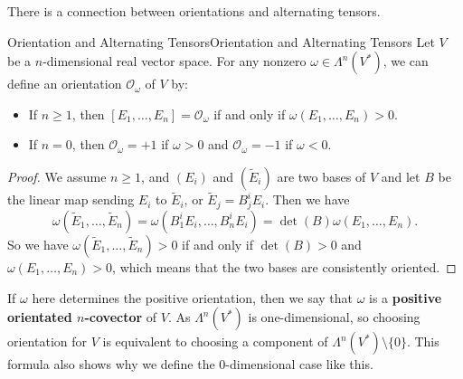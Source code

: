 \documentclass[../main.tex]{subfiles}
\begin{document}
There is a connection between orientations and alternating tensors.
\begin{proposition}{Orientation and Alternating Tensors}{Orientation and Alternating Tensors}
  Let $V$ be a $n$-dimensional real vector space. For any nonzero $\omega \in \Lambda^n(V^*)$, we can define an orientation $\mathcal{O}_\omega$ of $V$ by:
  \begin{itemize}
    \item If $n\geq 1$, then $[E_1, \ldots , E_n] = \mathcal{O}_\omega$ if and only if $\omega(E_1, \ldots , E_n) > 0$.
    \item If $n=0$, then $\mathcal{O}_\omega = +1$ if $\omega > 0$ and $\mathcal{O}_\omega = -1$ if $\omega < 0$.
  \end{itemize}
\end{proposition}
\begin{proof}
  We assume $n \geq 1$, and $(E_i)$ and $(\tilde{E}_i)$ are two bases of $V$ and let $B$ be the linear map sending $E_i$ to $\tilde{E}_i$, or $\tilde{E}_j = B^i_j E_i$. Then we have
  \begin{equation*}
    \omega(\tilde{E}_1, \ldots , \tilde{E}_n) = \omega(B^i_1 E_i, \ldots , B^i_n E_i) = \det(B) \omega(E_1, \ldots , E_n).
  \end{equation*}
  So we have $\omega(\tilde{E}_1, \ldots , \tilde{E}_n) > 0$ if and only if $\det(B) > 0$ and $\omega(E_1, \ldots , E_n) > 0$, which means that the two bases are consistently oriented.
\end{proof}
If $\omega$ here determines the positive orientation, then we say that $\omega$ is a \textbf{positive orientated $n$-covector} of $V$. As $\Lambda^n(V^*)$ is one-dimensional, so choosing orientation for $V$ is equivalent to choosing a component of $\Lambda^n(V^*) \setminus \{0\}$. This formula also shows why we define the 0-dimensional case like this.
\end{document}
